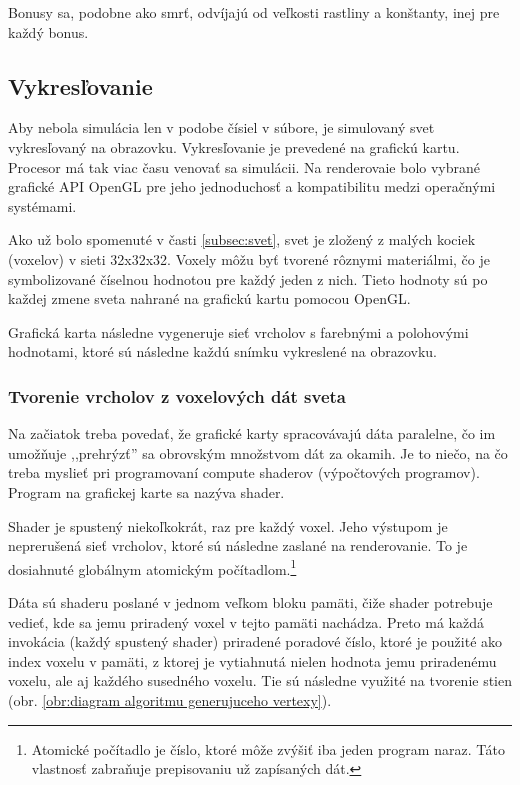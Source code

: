 \documentclass[12pt]{article}
\begin{document}
Bonusy sa, podobne ako smrť, odvíjajú od veľkosti rastliny a konštanty, inej pre
každý bonus.

\subsection{Vykresľovanie}

Aby nebola simulácia len v podobe čísiel v súbore, je simulovaný svet
vykresľovaný na obrazovku. Vykresľovanie je prevedené na grafickú kartu.
Procesor má tak viac času venovať sa simulácii. Na renderovaie bolo vybrané
grafické API OpenGL pre jeho jednoduchosť a kompatibilitu medzi operačnými
systémami.

Ako už bolo spomenuté v časti \ref{subsec:svet}, svet je zložený z malých
kociek (voxelov) v sieti 32x32x32. Voxely môžu byť tvorené rôznymi materiálmi,
čo je symbolizované číselnou hodnotou pre každý jeden z nich. Tieto
hodnoty sú po každej zmene sveta nahrané na grafickú kartu pomocou OpenGL.

Grafická karta následne vygeneruje sieť vrcholov s farebnými a
polohovými hodnotami, ktoré sú následne každú snímku vykreslené na obrazovku.

\subsubsection{Tvorenie vrcholov z voxelových dát sveta}

Na začiatok treba povedať, že grafické karty spracovávajú dáta paralelne,
čo im umožňuje ,,prehrýzť'' sa obrovským množstvom dát za okamih.
Je to niečo, na čo treba myslieť pri programovaní compute shaderov
(výpočtových programov). Program na grafickej karte sa nazýva shader.

Shader je spustený niekoľkokrát, raz pre každý voxel. Jeho výstupom je
neprerušená sieť vrcholov, ktoré sú následne zaslané na renderovanie.
To je dosiahnuté globálnym atomickým počítadlom.\footnote
{Atomické počítadlo je číslo, ktoré môže zvýšiť iba jeden program naraz. Táto
	vlastnosť zabraňuje prepisovaniu už zapísaných dát.}

Dáta sú shaderu poslané v jednom veľkom bloku pamäti, čiže shader potrebuje
vedieť, kde sa jemu priradený voxel v tejto pamäti nachádza. Preto má každá
invokácia (každý spustený shader) priradené poradové číslo, ktoré
je použité ako index voxelu v pamäti, z ktorej je vytiahnutá nielen
hodnota jemu priradenému voxelu, ale aj každého susedného voxelu. Tie sú
následne využité na tvorenie stien
(obr. \ref{obr:diagram algoritmu generujuceho vertexy}).
\end{document}
